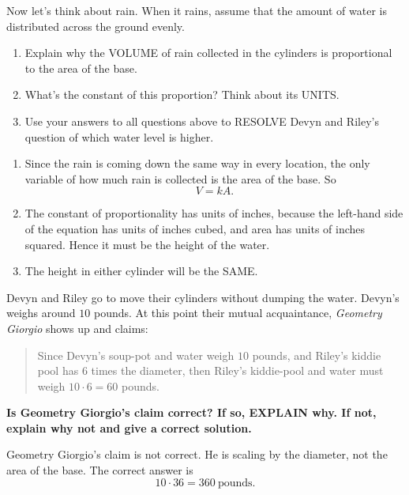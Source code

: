 \documentclass[nooutcomes,noauthor,hints]{ximera}
\begin{document}
\begin{question}
  Now let's think about rain. When it rains, assume that the amount of
  water is distributed across the ground evenly.
  \begin{enumerate}
  \item Explain why the VOLUME of rain collected in the cylinders is
    proportional to the area of the base.
  \item What's the constant of this proportion? Think about its UNITS.
  \item Use your answers to all questions above to RESOLVE Devyn and
    Riley's question of which water level is higher.
  \end{enumerate}
  \begin{freeResponse}
    \begin{enumerate}
    \item Since the rain is coming down the same way in every
      location, the only variable of how much rain is collected is the
      area of the base. So
      \[
      V= k A.
      \]
    \item The constant of proportionality has units of inches, because
      the left-hand side of the equation has units of inches cubed,
      and area has units of inches squared. Hence it must be the height
      of the water.
    \item The height in either cylinder will be the SAME. 
    \end{enumerate}
  \end{freeResponse}
\end{question}
\mynewpage


\begin{question}
  Devyn and Riley go to move their cylinders without dumping the
  water. Devyn's weighs around $10$ pounds. At this point their mutual
  acquaintance, \textit{Geometry Giorgio} shows up and claims:
  \begin{quote}
    Since Devyn's soup-pot and water weigh $10$ pounds, and Riley's
    kiddie pool has $6$ times the diameter, then Riley's kiddie-pool
    and water must weigh $10\cdot 6 = 60$ pounds.
  \end{quote}
  \textbf{Is Geometry Giorgio’s claim correct?  If so, EXPLAIN why. If
    not, explain why not and give a correct solution.}
  \begin{freeResponse}
    Geometry Giorgio’s claim is not correct. He is scaling by the
    diameter, not the area of the base. The correct answer is
    \[
    10\cdot 36=360~\text{pounds}.
    \]
  \end{freeResponse}
\end{question}
\end{document}
